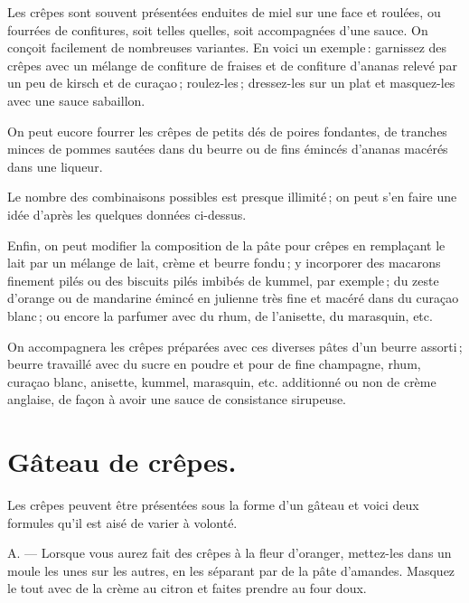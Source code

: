 Les crêpes sont souvent présentées enduites de miel sur une face et roulées, ou
fourrées de confitures, soit telles quelles, soit accompagnées d'une sauce. On
conçoit facilement de nombreuses variantes. En voici un exemple : garnissez des
crêpes avec un mélange de confiture de fraises et de confiture d'ananas relevé
par un peu de kirsch et de curaçao ; roulez-les ; dressez-les sur un plat et
masquez-les avec une sauce sabaillon.

\sk

On peut eucore fourrer les crêpes de petits dés de poires fondantes, de tranches
minces de pommes sautées dans du beurre ou de fins émincés d'ananas macérés
dans une liqueur.

Le nombre des combinaisons possibles est presque illimité ; on peut s'en faire
une idée d'après les quelques données ci-dessus.

\sk

Enfin, on peut modifier la composition de la pâte pour crêpes en remplaçant le
lait par un mélange de lait, crème et beurre fondu ; y incorporer des macarons
finement pilés ou des biscuits pilés imbibés de kummel, par exemple ; du zeste
d'orange ou de mandarine émincé en julienne très fine et macéré dans du curaçao
blanc ; ou encore la parfumer avec du rhum, de l'anisette, du marasquin, etc.

On accompagnera les crêpes préparées avec ces diverses pâtes d'un beurre
assorti ; beurre travaillé avec du sucre en poudre et {\mmm} pour
{\mmm} de fine champagne, rhum, curaçao blanc, anisette, kummel,
marasquin, etc. additionné ou non de crème anglaise, de façon à avoir une sauce
de consistance sirupeuse.

\section*{\centering Gâteau de crêpes.}
{}

Les crêpes peuvent être présentées sous la forme d'un gâteau et voici deux
formules qu'il est aisé de varier à volonté.

\medskip

A. — Lorsque vous aurez fait des crêpes à la fleur d'oranger, mettez-les dans
un moule les unes sur les autres, en les séparant par de la pâte d'amandes.
Masquez le tout avec de la crème au citron et faites prendre au four doux.

